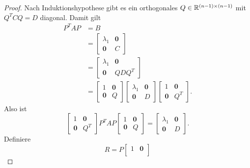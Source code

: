 \begin{proof}
    Nach Induktionshypothese gibt es ein orthogonales \(Q \in \mathbb{R}^{(n-1)\times(n-1)}\) mit \(Q^{T}CQ = D\) diagonal. 
    Damit gilt
    \begin{align*}
        P^{T}AP &= B \\
        &= 
        \begin{bmatrix}
            {\lambda}_1 & \symbf{0} \\
            \symbf{0} & C
        \end{bmatrix} \\
        &=
        \begin{bmatrix}
            {\lambda}_1 & \symbf{0} \\
            \symbf{0} & QDQ^{T}
        \end{bmatrix} \\
        &=
        \begin{bmatrix}
            1 & \symbf{0} \\
            \symbf{0} & Q
        \end{bmatrix}
        \begin{bmatrix}
            {\lambda}_1 & \symbf{0} \\
            \symbf{0} & D
        \end{bmatrix}
        \begin{bmatrix}
            1 & \symbf{0} \\
            \symbf{0} & Q^{T}
        \end{bmatrix}.
    \end{align*}
    Also ist
    \begin{equation*}
        \begin{bmatrix}
            1 & \symbf{0} \\
            \symbf{0} & Q^{T}
        \end{bmatrix}
        P^{T}AP
        \begin{bmatrix}
            1 & \symbf{0} \\
            \symbf{0} & Q
        \end{bmatrix}
        =
        \begin{bmatrix}
            {\lambda}_1 & \symbf{0} \\
            \symbf{0} & D
        \end{bmatrix}.
    \end{equation*} 
    Definiere
    \begin{equation*}
        R = P
        \begin{bmatrix}
            1 & \symbf{0} \\

\end{bmatrix}
\end{equation*}
\end{proof}
